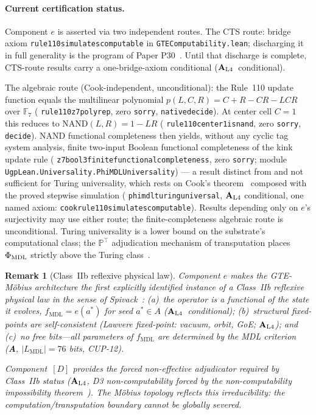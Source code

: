 \documentclass[12pt,letterpaper]{article}
\newtheorem{remark}[theorem]{Remark}
\newcommand{\fmdl}{f_{\mathrm{MDL}}}
\newcommand{\catAL}{\ensuremath{\textbf{A}_{\rm L4}}}
\newcommand{\catA}{\textbf{A}}
\newcommand{\lean}[1]{%
  \penalty-100
  \begingroup\def\_{\textunderscore\allowbreak}\texttt{#1}\endgroup}
\begin{document}
\paragraph{Current certification status.}
Component $e$ is asserted via two independent routes.
The CTS route: bridge axiom \lean{rule110\_simulates\_computable} in
\lean{GTEComputability.lean}; discharging it in full generality is the program of
Paper P30~\cite{SpivackCookTheorem}.  Until that discharge is complete, CTS-route results
carry a one-bridge-axiom conditional (\catAL\ conditional).

The algebraic route (Cook-independent, unconditional): the Rule~110 update function equals
the multilinear polynomial $p(L,C,R)=C+R-CR-LCR$ over $\mathbb{F}_7$
(\lean{rule110\_z7\_poly\_rep}, zero \texttt{sorry}, \lean{native\_decide}).
At center cell $C=1$ this reduces to $\mathrm{NAND}(L,R) = 1-LR$
(\lean{rule110\_center1\_is\_nand}, zero \texttt{sorry}, \lean{decide}).
NAND functional completeness then yields, without any cyclic tag system analysis, finite
two-input Boolean functional completeness of the kink update rule
(\lean{z7\_bool3\_finite\_functional\_completeness}, zero \texttt{sorry}; module
\lean{UgpLean.Universality.PhiMDLUniversality}) --- a result distinct from and not
sufficient for Turing universality, which rests on Cook's theorem~\cite{Cook2004}
composed with the proved stepwise simulation (\lean{phimdl\_turing\_universal},
\catAL{} conditional, one named axiom: \lean{cook\_rule110\_simulates\_computable}).
Results depending only on $e$'s surjectivity may use either route; the finite-completeness
algebraic route is unconditional.
Turing universality is a lower bound on the substrate's computational class; the
$\mathbb{P}^\top$ adjudication mechanism of transputation places $\Phi_{\rm MDL}$ strictly
above the Turing class~\cite{SpivackNEMS76}.

\begin{remark}[Class~IIb reflexive physical law]
\label{rem:reflexive-law}
Component $e$ makes the GTE-M\"obius architecture the first explicitly identified
instance of a \emph{Class~IIb reflexive physical law} in the sense of
Spivack~\cite{SpivackReflexiveLaw}: (a)~the operator is a functional of the state it
evolves, $\fmdl = e(a^*)$ for seed $a^* \in A$ (\catAL\ conditional);
(b)~structural fixed-points are self-consistent (Lawvere fixed-point: vacuum, orbit,
GoE; \catAL); and (c)~no free bits---all parameters of $\fmdl$ are determined by the
MDL criterion (\catA, $|L_{\mathrm{MDL}}| = 76$ bits, CUP-12).

Component~$[D]$ provides the forced non-effective adjudicator required by Class~IIb
status (\catAL, D3 non-computability forced by the non-computability impossibility theorem~\cite{SpivackNEMS09}).
The M\"obius topology reflects this irreducibility: the computation/transputation
boundary cannot be globally severed.
\end{remark}
\end{document}
